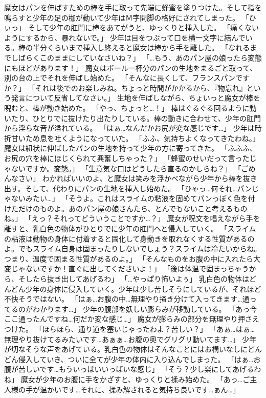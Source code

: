 魔女はパンを伸ばすための棒を手に取って先端に蜂蜜を塗りつけた。そして指を鳴らすと少年の足の枷が動いて少年はＭ字開脚の格好にされてしまった。
「ひぃっ」
そして少年の肛門に棒をあてがうと、ゆっくりと挿入した。
「痛くないようにするから、暴れないで。」
少年は目をつぶって口を横一文字に結んでいる。棒の半分くらいまで挿入し終えると魔女は棒から手を離した。
「なれるまでしばらくこのままにしていなさいね？」
「…もう、あのパン屋の娘ったら変態にもほどがあります！」
魔女はボール一杯分のパンの生地をまるごと取って、別の台の上でそれを伸ばし始めた。
「そんなに長くして、フランスパンですか？」
「それは後でのお楽しみね。ちょっと時間がかかるから、『物忘れ』という発言について反省してなさい。」
生地を伸ばしながら、ちょいっと魔女が棒を睨むと、棒が動き始めた。
「やっ、ちょっと…！」
棒はぐるぐる回るように動いたり、ひとりでに抜けたり出たりしている。棒の動きに合わせて、少年の肛門から淫らな音が溢れている。
「はぁ…なんだかお尻が変な感じです…」
少年は時折甘いため息を吐くようになっていた。
「ふふ、気持ちよくなってきたわね。」
魔女は紐状に伸ばしたパンの生地を持って少年の方に寄ってきた。
「ふふふ、お尻の穴を棒にほじくられて興奮しちゃった？」
「蜂蜜のせいだって言ったじゃないですか。変態。」
「生意気な口はどうしたら直るのかしらね？」
「ごめんなさい」
わかればいいのよ、と魔女は笑みを浮かべながら少年から棒を抜き出す。そして、代わりにパンの生地を挿入し始めた。
「ひゃっ…何それ…パンじゃないみたい…」
「そうよ。これはスライムの粘液を固めてパンっぽく色を付けただけのものよ。あのパン屋の娘さんたら、とんでもないこと考えるものね。」
「えっ？それってどういうことですか…？」
魔女が呪文を唱えながら手を離すと、乳白色の物体がひとりでに少年の肛門へと侵入していく。
「スライムの粘液は動物の身体に付着すると固化して身動きを取れなくする性質があるのよ。でもスライム自身は固まったりしないでしょう？スライムは冷たいからね。つまり、温度で固まる性質があるのよ。」
「そんなものをお腹の中に入れたら大変じゃないですか！直ぐに出してくださいよ！」
「後は体温で固まっちゃうから、そしたら抜き出してあげるわ」
「…やっぱり怖いよぅ」
乳白色の物体はどんどん少年の身体に侵入していく。少年は少し苦しそうにしているが、それほど不快そうではない。
「はぁ…お腹の中…無理やり掻き分けて入ってきます…通ってるのがわかります…」
少年の腹部を妖しい膨らみが移動している。
「あっ今ここ通ったんですね…何だか変な感じ…」
魔女が膨らみの部分を無理やり押さえつけた。
「ほらほら、通り道を塞いじゃったわよ？苦しい？」
「あぁ…はぁ…無理やり抜けてるみたいです…あぁぁ…お腹の奥でグリグリ動いてます…」
少年が切なそうな声をあげている。乳白色の物体はそんなことにはお構いなしにどんどん侵入していき、ついに全てが少年の体内に入り込んでしまった。
「はぁ…お腹が苦しいです…もういっぱいいっぱいな感じ」
「そう？少し楽にしてあげるわね」
魔女が少年のお腹に手をかざすと、ゆっくりと揉み始めた。
「あっ…ご主人様の手が温かいです…それに、揉み解されると気持ち良いです…ぁん…」








